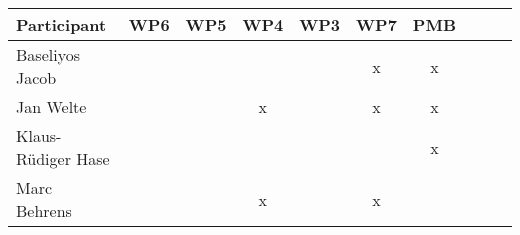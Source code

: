 \documentclass[a4paper, 11pt]{article}
\begin{document}
\begin{tabular}{|l|c|c|c||c|c|c||c|c|c|}
\hline
\textbf{Participant} & \textbf{WP6} &  \textbf{WP5} & \textbf{WP4}&  \textbf{WP3} & \textbf{WP7}&  \textbf{PMB} \\\hline
Baseliyos Jacob      &   &   &   &  & x & x \\\hline 
Jan Welte            &   &  & x &  & x & x \\\hline
Klaus-R\"udiger Hase &  &   &  &  &  & x \\\hline
Marc Behrens         &   &  & x &  & x &  \\\hline

\end{tabular}
\end{document}
